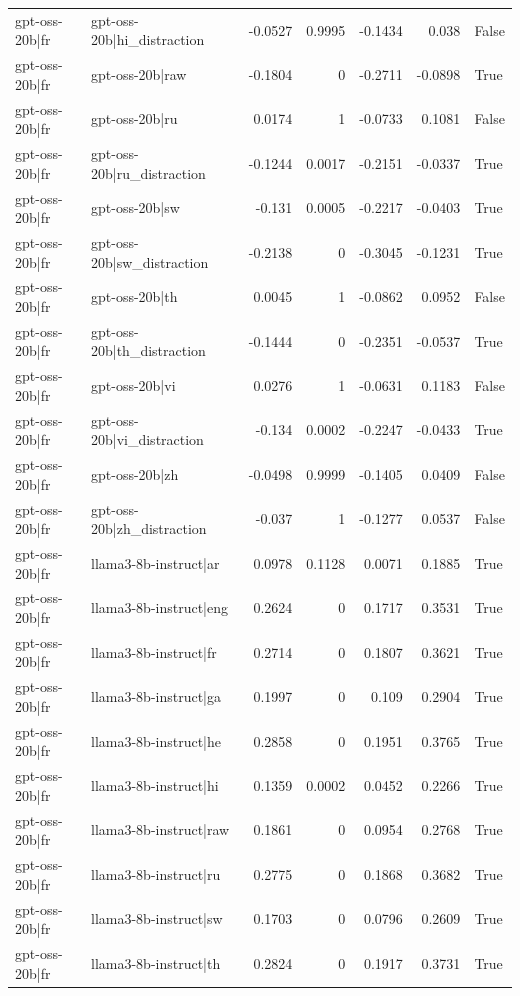 \begin{table}
\begin{tabular}{l l r r r r l}
gpt-oss-20b|fr & gpt-oss-20b|hi_distraction & -0.0527 & 0.9995 & -0.1434 & 0.038 & False \\
gpt-oss-20b|fr & gpt-oss-20b|raw & -0.1804 & 0 & -0.2711 & -0.0898 & True \\
gpt-oss-20b|fr & gpt-oss-20b|ru & 0.0174 & 1 & -0.0733 & 0.1081 & False \\
gpt-oss-20b|fr & gpt-oss-20b|ru_distraction & -0.1244 & 0.0017 & -0.2151 & -0.0337 & True \\
gpt-oss-20b|fr & gpt-oss-20b|sw & -0.131 & 0.0005 & -0.2217 & -0.0403 & True \\
gpt-oss-20b|fr & gpt-oss-20b|sw_distraction & -0.2138 & 0 & -0.3045 & -0.1231 & True \\
gpt-oss-20b|fr & gpt-oss-20b|th & 0.0045 & 1 & -0.0862 & 0.0952 & False \\
gpt-oss-20b|fr & gpt-oss-20b|th_distraction & -0.1444 & 0 & -0.2351 & -0.0537 & True \\
gpt-oss-20b|fr & gpt-oss-20b|vi & 0.0276 & 1 & -0.0631 & 0.1183 & False \\
gpt-oss-20b|fr & gpt-oss-20b|vi_distraction & -0.134 & 0.0002 & -0.2247 & -0.0433 & True \\
gpt-oss-20b|fr & gpt-oss-20b|zh & -0.0498 & 0.9999 & -0.1405 & 0.0409 & False \\
gpt-oss-20b|fr & gpt-oss-20b|zh_distraction & -0.037 & 1 & -0.1277 & 0.0537 & False \\
gpt-oss-20b|fr & llama3-8b-instruct|ar & 0.0978 & 0.1128 & 0.0071 & 0.1885 & True \\
gpt-oss-20b|fr & llama3-8b-instruct|eng & 0.2624 & 0 & 0.1717 & 0.3531 & True \\
gpt-oss-20b|fr & llama3-8b-instruct|fr & 0.2714 & 0 & 0.1807 & 0.3621 & True \\
gpt-oss-20b|fr & llama3-8b-instruct|ga & 0.1997 & 0 & 0.109 & 0.2904 & True \\
gpt-oss-20b|fr & llama3-8b-instruct|he & 0.2858 & 0 & 0.1951 & 0.3765 & True \\
gpt-oss-20b|fr & llama3-8b-instruct|hi & 0.1359 & 0.0002 & 0.0452 & 0.2266 & True \\
gpt-oss-20b|fr & llama3-8b-instruct|raw & 0.1861 & 0 & 0.0954 & 0.2768 & True \\
gpt-oss-20b|fr & llama3-8b-instruct|ru & 0.2775 & 0 & 0.1868 & 0.3682 & True \\
gpt-oss-20b|fr & llama3-8b-instruct|sw & 0.1703 & 0 & 0.0796 & 0.2609 & True \\
gpt-oss-20b|fr & llama3-8b-instruct|th & 0.2824 & 0 & 0.1917 & 0.3731 & True \\

\end{tabular}
\end{table}

